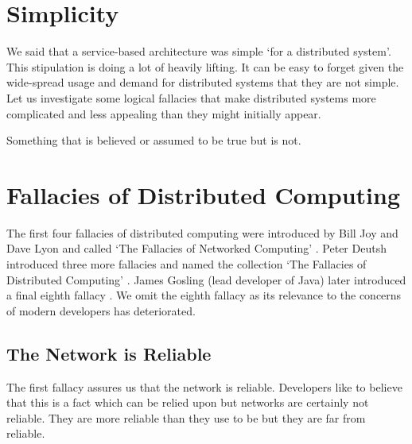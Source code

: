 \section{Simplicity}
We said that a service-based architecture was simple `for a distributed system'.
This stipulation is doing a lot of heavily lifting.
It can be easy to forget given the wide-spread usage and demand for distributed systems that they are not simple.
%
Let us investigate some logical fallacies that make distributed systems more complicated and less appealing than they might initially appear.

\begin{definition}[Fallacy]
Something that is believed or assumed to be true but is not.
\end{definition}

\section{Fallacies of Distributed Computing}
The first four fallacies of distributed computing were introduced by Bill Joy and Dave Lyon and called `The Fallacies of Networked Computing' \cite{four-fallacies}.
Peter Deutsh introduced three more fallacies and named the collection `The Fallacies of Distributed Computing' \cite{eight-fallacies}.
James Gosling (lead developer of Java) later introduced a final eighth fallacy \cite{four-fallacies}.
We omit the eighth fallacy as its relevance to the concerns of modern developers has deteriorated.

\subsection{The Network is Reliable}
The first fallacy assures us that the network is reliable.
Developers like to believe that this is a fact which can be relied upon but networks are certainly not reliable.
They are more reliable than they use to be but they are far from reliable.

